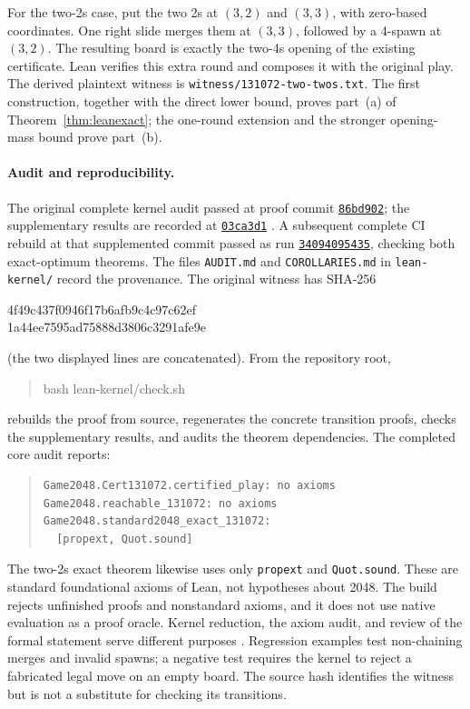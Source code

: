 For the two-2s case, put the two 2s at $(3,2)$ and $(3,3)$, with
zero-based coordinates. One right slide merges them at $(3,3)$, followed
by a 4-spawn at $(3,2)$. The resulting board is exactly the two-4s opening
of the existing certificate. Lean verifies this extra round and composes
it with the original play. The derived plaintext witness is
\texttt{witness/131072-two-twos.txt}. The first construction, together
with the direct lower bound, proves part~(a) of
Theorem~\ref{thm:leanexact}; the one-round extension and the stronger
opening-mass bound prove part~(b).

\paragraph{Audit and reproducibility.}
The original complete kernel audit passed at proof commit
\href{https://github.com/DomTheDeveloper/2048-undo/commit/86bd902861306f43a5697edcf86ccd3f96028aef}{\texttt{86bd902}}; the supplementary
results are recorded at \href{https://github.com/DomTheDeveloper/2048-undo/commit/03ca3d181640a2c2a7685efc3ead4ff932d925e4}{\texttt{03ca3d1}}
\cite{lean2048artifact2026}. A subsequent complete CI rebuild at that
supplemented commit passed as run
\href{https://github.com/DomTheDeveloper/2048-undo/actions/runs/34094095435}{\texttt{34094095435}}, checking both exact-optimum theorems.
The files \texttt{AUDIT.md} and
\texttt{COROLLARIES.md} in \texttt{lean-kernel/} record the provenance.
The original witness has SHA-256
\begin{center}\footnotesize\ttfamily
4f49c437f0946f17b6afb9c4c97c62ef\\
1a44ee7595ad75888d3806c3291afe9e
\end{center}
(the two displayed lines are concatenated). From the repository root,
\begin{quote}\ttfamily
bash lean-kernel/check.sh
\end{quote}
rebuilds the proof from source, regenerates the concrete transition proofs,
checks the supplementary results, and audits the theorem dependencies.
The completed core audit reports:
\begin{quote}\footnotesize
\begin{verbatim}
Game2048.Cert131072.certified_play: no axioms
Game2048.reachable_131072: no axioms
Game2048.standard2048_exact_131072:
  [propext, Quot.sound]
\end{verbatim}
\end{quote}
The two-2s exact theorem likewise uses only
\texttt{propext} and \texttt{Quot.sound}. These are standard foundational
axioms of Lean, not hypotheses about 2048. The build rejects unfinished
proofs and nonstandard axioms, and it does not use native evaluation as a
proof oracle. Kernel reduction, the axiom audit, and review of the
formal statement serve different purposes \cite{leanvalidation2026}.
Regression examples test non-chaining merges and invalid spawns; a
negative test requires the kernel to reject a fabricated legal move on an
empty board. The source hash identifies the witness but is not a
substitute for checking its transitions.

